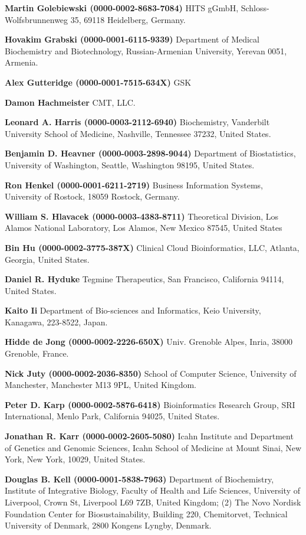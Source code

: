 \documentclass{sbml-paper}
\begin{document}
\textbf{Martin Golebiewski (0000-0002-8683-7084)} HITS gGmbH, Schloss-Wolfsbrunnenweg 35, 69118 Heidelberg, Germany.

\textbf{Hovakim Grabski (0000-0001-6115-9339)} Department of Medical Biochemistry and Biotechnology, Russian-Armenian University, Yerevan 0051, Armenia.

\textbf{Alex Gutteridge (0000-0001-7515-634X)} GSK

\textbf{Damon Hachmeister} CMT, LLC.

\textbf{Leonard A. Harris (0000-0003-2112-6940)} Biochemistry, Vanderbilt University School of Medicine, Nashville, Tennessee 37232, United States.

\textbf{Benjamin D. Heavner (0000-0003-2898-9044)} Department of Biostatistics, University of Washington, Seattle, Washington 98195, United States.

\textbf{Ron Henkel (0000-0001-6211-2719)} Business Information Systems, University of Rostock, 18059 Rostock, Germany.

\textbf{William S. Hlavacek (0000-0003-4383-8711)} Theoretical Division, Los Alamos National Laboratory, Los Alamos, New Mexico 87545, United States

\textbf{Bin Hu (0000-0002-3775-387X)} Clinical Cloud Bioinformatics, LLC, Atlanta, Georgia, United States.

\textbf{Daniel R. Hyduke} Tegmine Therapeutics, San Francisco, California 94114, United States.

\textbf{Kaito Ii} Department of Bio-sciences and Informatics, Keio University, Kanagawa, 223-8522, Japan.

\textbf{Hidde de Jong (0000-0002-2226-650X)} Univ. Grenoble Alpes, Inria, 38000 Grenoble, France.

\textbf{Nick Juty (0000-0002-2036-8350)} School of Computer Science, University of Manchester, Manchester M13 9PL, United Kingdom.

\textbf{Peter D. Karp (0000-0002-5876-6418)} Bioinformatics Research Group, SRI International, Menlo Park, California 94025, United States.

\textbf{Jonathan R. Karr (0000-0002-2605-5080)} Icahn Institute and Department of Genetics and Genomic Sciences, Icahn School of Medicine at Mount Sinai, New York, New York, 10029, United States.

\textbf{Douglas B. Kell (0000-0001-5838-7963)} Department of Biochemistry, Institute of Integrative Biology, Faculty of Health and Life Sciences, University of Liverpool, Crown St, Liverpool L69 7ZB, United Kingdom; (2) The Novo Nordisk Foundation Center for Biosustainability, Building 220, Chemitorvet, Technical University of Denmark, 2800 Kongens Lyngby, Denmark.
\end{document}
